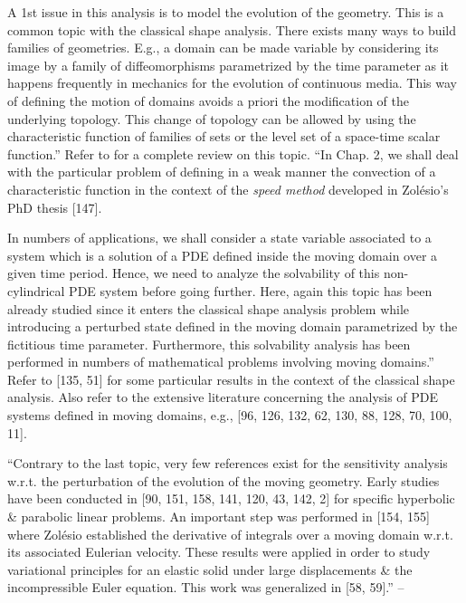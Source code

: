\documentclass[oneside]{book}
\numberwithin{equation}{section}
\begin{document}
A 1st issue in this analysis is to model the evolution of the geometry. This is a common topic with the classical shape analysis. There exists many ways to build families of geometries. E.g., a domain can be made variable by considering its image by a family of diffeomorphisms parametrized by the time parameter as it happens frequently in mechanics for the evolution of continuous media. This way of defining the motion of domains avoids a priori the modification of the underlying topology. This change of topology can be allowed by using the characteristic function of families of sets or the level set of a space-time scalar function.'' Refer to \cite{Delfour_Zolesio2001, Delfour_Zolesio2011} for a complete review on this topic. ``In Chap. 2, we shall deal with the particular problem of defining in a weak manner the convection of a characteristic function in the context of the \textit{speed method} developed in Zol\'esio's PhD thesis [147].

In numbers of applications, we shall consider a state variable associated to a system which is a solution of a PDE defined inside the moving domain over a given time period. Hence, we need to analyze the solvability of this non-cylindrical PDE system before going further. Here, again this topic has been already studied since it enters the classical shape analysis problem while introducing a perturbed state defined in the moving domain parametrized by the fictitious time parameter. Furthermore, this solvability analysis has been performed in numbers of mathematical problems involving moving domains.'' Refer to [135, 51] for some particular results in the context of the classical shape analysis. Also refer to the extensive literature concerning the analysis of PDE systems defined in moving domains, e.g., [96, 126, 132, 62, 130, 88, 128, 70, 100, 11].

``Contrary to the last topic, very few references exist for the sensitivity analysis w.r.t. the perturbation of the evolution of the moving geometry. Early studies have been conducted in [90, 151, 158, 141, 120, 43, 142, 2] for specific hyperbolic \& parabolic linear problems. An important step was performed in [154, 155] where Zol\'esio established the derivative of integrals over a moving domain w.r.t. its associated Eulerian velocity. These results were applied in order to study variational principles for an elastic solid under large displacements \& the incompressible Euler equation. This work was generalized in [58, 59].'' -- \cite[Chap. 1, Sect. 1.1, pp. 3--4]{Moubachir_Zolesio2006}
\end{document}
